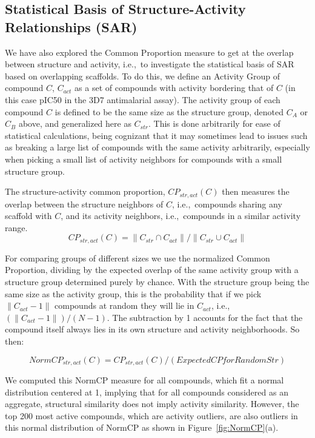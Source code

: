 \documentclass[journal=jacsat,biochem,manuscript=article]{achemso}
\newcommand*\fref[1]{Figure~\ref{fig:#1}}
\newcommand*\ie{i.e.,~}
\begin{document}
\subsection{Statistical Basis of Structure-Activity Relationships (SAR)}\label{sec:statSAR}

We have also explored the Common Proportion measure to get at the overlap between structure and activity, \ie to investigate the statistical basis of SAR based on overlapping scaffolds. To do this, we define an Activity Group of compound $C$, $C_{act}$ as a set of compounds with activity bordering that of $C$ (in this case pIC50 in the 3D7 antimalarial assay). The activity group of each compound $C$ is defined to be the same size as the structure group, denoted $C_A$ or $C_B$ above, and generalized here as $C_{str}$.  This is done arbitrarily for ease of statistical calculations, being cognizant that it may sometimes lead to issues such as breaking a large list of compounds with the same activity arbitrarily, especially when picking a small list of activity neighbors for compounds with a small structure group.

The structure-activity common proportion, $CP_{str,act}(C)$ then measures the overlap between the structure neighbors of $C$, \ie compounds sharing any scaffold with $C$, and its activity neighbors, \ie compounds in a similar activity range.
\begin{equation}
CP_{str,act}(C) = \| C_{str} \cap C_{act} \| / \| C_{str} \cup C_{act} \|
\end{equation}

For comparing groups of different sizes we use the normalized Common Proportion, dividing by the expected overlap of the same activity group with a structure group determined purely by chance.  With the structure group being the same size as the activity group, this is the probability that if we pick $ \| C_{act} - 1\|$ compounds at random they will lie in $C_{act}$, \ie $(\| C_{act} - 1\|)/(N - 1)$. The subtraction by 1 accounts for the fact that the compound itself always lies in its own structure and activity neighborhoods. So then:

\begin{equation}
NormCP_{str,act}(C) = CP_{str,act}(C) / (Expected CP for Random Str) 
\end{equation}

We computed this NormCP measure for all compounds, which fit a normal distribution centered at 1, implying that for all compounds considered as an aggregate, structural similarity does not imply activity similarity.  However, the top 200 most active compounds, which are activity outliers, are also outliers in this normal distribution of NormCP as shown in \fref{NormCP}(a).
\end{document}
